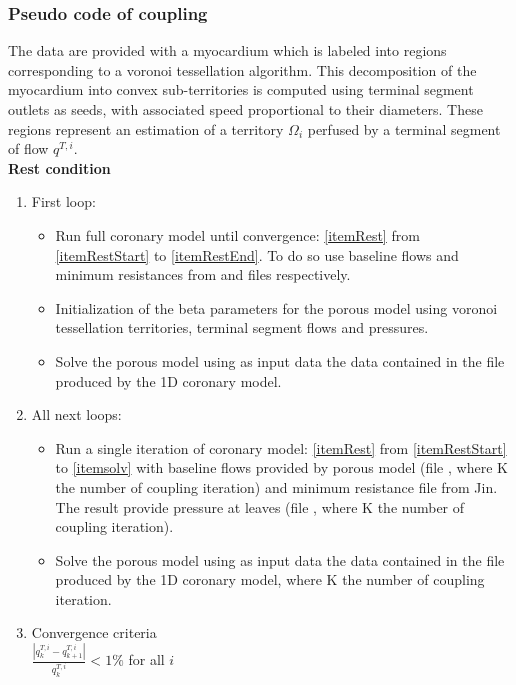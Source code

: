 \documentclass[a4paper, 11pt]{article} %
\begin{document}
\subsubsection{Pseudo code of coupling}

The data are provided with a myocardium which is labeled into regions corresponding to a voronoi tessellation algorithm. This  decomposition of the myocardium into convex sub-territories is computed using terminal segment outlets as seeds, with associated speed proportional to their diameters. These regions represent an estimation of a territory $\Omega_i$ perfused by a terminal segment of flow $q^{T,i}$.\\
 
\textbf{Rest condition}\\
\begin{enumerate}[label=(\roman*)]
\item First loop:
\begin{itemize}
\item Run full coronary model until convergence: \ref{itemRest} from \ref{itemRestStart} to \ref{itemRestEnd}. To do so use baseline flows and minimum resistances from  and  files respectively.
\item Initialization of the beta parameters for the porous model using voronoi tessellation territories, terminal segment flows and pressures.
\item Solve the porous model using as input data the data contained in the  file produced by the 1D coronary model.
\end{itemize}
\item All next loops:
\begin{itemize}
\item Run a single iteration of coronary model: \ref{itemRest} from \ref{itemRestStart} to \ref{itemsolv} with baseline flows provided by porous model (file , where K the number of coupling iteration) and minimum resistance file from Jin. The result provide pressure at leaves (file , where K the number of coupling iteration).
\item Solve the porous model using as input data the data contained in the  file produced by the 1D coronary model, where K the number of coupling iteration.
\end{itemize}
\item Convergence criteria\\
$\frac{\left\lvert q^{T,i}_{k} - q^{T,i}_{k+1} \right\rvert}{q^{T,i}_k} < 1 \%$ for all $i$
\end{enumerate}
\end{document}
